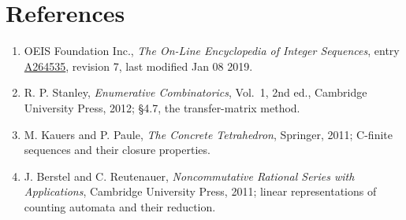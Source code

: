 \documentclass[11pt]{article}
\theoremstyle{definition}
\begin{document}
\section{References}

\begin{enumerate}

\item OEIS Foundation Inc., \emph{The On-Line Encyclopedia of Integer Sequences}, entry \href{https://oeis.org/A264535}{A264535}, revision 7, last modified Jan 08 2019.

\item R. P. Stanley, \emph{Enumerative Combinatorics}, Vol.~1, 2nd ed., Cambridge University Press, 2012; \S4.7, the transfer-matrix method.

\item M. Kauers and P. Paule, \emph{The Concrete Tetrahedron}, Springer, 2011; C-finite sequences and their closure properties.

\item J. Berstel and C. Reutenauer, \emph{Noncommutative Rational Series with Applications}, Cambridge University Press, 2011; linear representations of counting automata and their reduction.

\end{enumerate}
\end{document}
